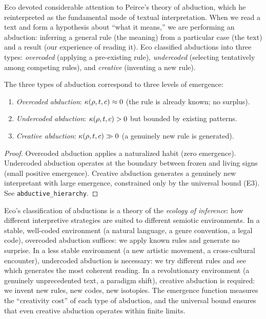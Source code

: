 Eco devoted considerable attention to Peirce's theory of abduction,
which he reinterpreted as the fundamental mode of textual interpretation.
When we read a text and form a hypothesis about ``what it means,'' we
are performing an abduction: inferring a general rule (the meaning)
from a particular case (the text) and a result (our experience of
reading it). Eco classified abductions into three types:
\emph{overcoded} (applying a pre-existing rule), \emph{undercoded}
(selecting tentatively among competing rules), and \emph{creative}
(inventing a new rule).

\begin{theorem}
\label{thm:abductive-hierarchy}
The three types of abduction correspond to three levels of emergence:
\begin{enumerate}
\item \emph{Overcoded abduction}: $\kappa(\rho, t, c) \approx 0$
(the rule is already known; no surplus).
\item \emph{Undercoded abduction}: $\kappa(\rho, t, c) > 0$ but
bounded by existing patterns.
\item \emph{Creative abduction}: $\kappa(\rho, t, c) \gg 0$
(a genuinely new rule is generated).
\end{enumerate}
\end{theorem}

\begin{proof}
Overcoded abduction applies a naturalized habit (zero emergence).
Undercoded abduction operates at the boundary between frozen and living
signs (small positive emergence). Creative abduction generates a
genuinely new interpretant with large emergence, constrained only by
the universal bound (E3). See \texttt{abductive\_hierarchy}.
\end{proof}

\begin{interpretation}
Eco's classification of abductions is a theory of the \emph{ecology
of inference}: how different interpretive strategies are suited to
different semiotic environments. In a stable, well-coded environment
(a natural language, a genre convention, a legal code), overcoded
abduction suffices: we apply known rules and generate no surprise. In
a less stable environment (a new artistic movement, a cross-cultural
encounter), undercoded abduction is necessary: we try different rules
and see which generates the most coherent reading. In a revolutionary
environment (a genuinely unprecedented text, a paradigm shift),
creative abduction is required: we invent new rules, new codes, new
isotopies. The emergence function measures the ``creativity cost''
of each type of abduction, and the universal bound ensures that even
creative abduction operates within finite limits.
\end{interpretation}

